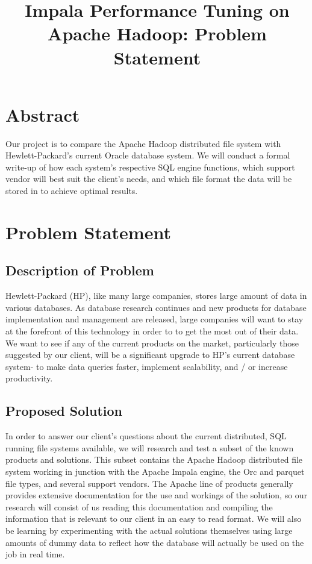 \documentclass[letterpaper,10pt,fleqn,draftclsnofoot,onecolumn]{IEEEtran}
\title{Impala Performance Tuning on Apache Hadoop: Problem Statement}
\author{\name}
\begin{document}
	\maketitle
	\hrulefill
	\section*{Abstract}
	Our project is to compare the Apache Hadoop distributed file system with Hewlett-Packard’s current Oracle  database system. We will conduct a formal write-up of how each system’s respective SQL engine functions, which support vendor will best suit the client’s needs, and which file format the data will be stored in to achieve optimal results.
	\newpage
	
	\section*{Problem Statement}
	
	\subsection{Description of Problem}
	Hewlett-Packard (HP), like many large companies, stores large amount of data in various databases. As database research continues and new products for database implementation and management are released, large companies will want to stay at the forefront of this technology in order to to get the most out of their data. We want to see if any of the current products on the market, particularly those suggested by our client, will be a significant upgrade to HP’s current database system- to make data queries faster, implement scalability, and / or increase productivity.

	
	\subsection{Proposed Solution}
	In order to answer our client’s questions about the current distributed, SQL running file systems available, we will research and test a subset of the known products and solutions. This subset contains the Apache Hadoop distributed file system working in junction with the Apache Impala engine, the Orc and parquet file types, and several support vendors. The Apache line of products generally provides extensive documentation for the use and workings of the solution, so our research will consist of us reading this documentation and compiling the information that is relevant to our client in an easy to read format. We will also be learning by experimenting with the actual solutions themselves using large amounts of dummy data to reflect how the database will actually be used on the job in real time. 
\end{document}
